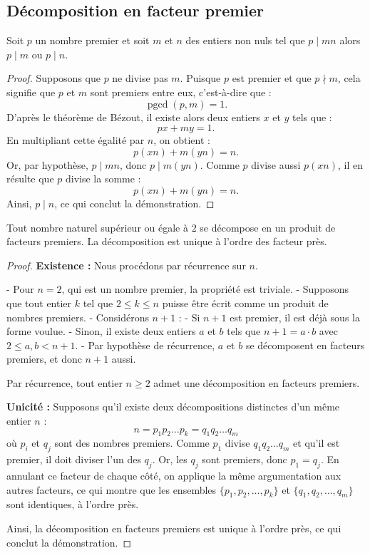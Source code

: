 \subsection{Décomposition en facteur premier}


\begin{lemme}[Euclide]
Soit $p$ un nombre premier et soit $m$ et $n$ des entiers non nuls tel que $p\mid mn$ alors $p\mid m$ ou $p\mid n$.
\end{lemme}

\begin{proof}
Supposons que \( p \) ne divise pas \( m \). Puisque \( p \) est premier et que \( p \nmid m \), cela signifie que \( p \) et \( m \) sont premiers entre eux, c'est-à-dire que :
\[
\operatorname{pgcd}(p, m) = 1.
\]
D'après le théorème de Bézout, il existe alors deux entiers \( x \) et \( y \) tels que :
\[
px + my = 1.
\]
En multipliant cette égalité par \( n \), on obtient :
\[
p(xn) + m(yn) = n.
\]
Or, par hypothèse, \( p \mid mn \), donc \( p \mid m(yn) \). Comme \( p \) divise aussi \( p(xn) \), il en résulte que \( p \) divise la somme :
\[
p(xn) + m(yn) = n.
\]
Ainsi, \( p \mid n \), ce qui conclut la démonstration.
\end{proof}

    

\begin{theoreme}
    Tout nombre naturel supérieur ou égale à $2$ se décompose en un produit de facteurs premiers. La décomposition est unique à l'ordre des facteur près.
\end{theoreme}

\begin{proof}
\textbf{Existence :} Nous procédons par récurrence sur \( n \).

- Pour \( n = 2 \), qui est un nombre premier, la propriété est triviale.
- Supposons que tout entier \( k \) tel que \( 2 \leq k \leq n \) puisse être écrit comme un produit de nombres premiers.
- Considérons \( n+1 \) :
  - Si \( n+1 \) est premier, il est déjà sous la forme voulue.
  - Sinon, il existe deux entiers \( a \) et \( b \) tels que \( n+1 = a \cdot b \) avec \( 2 \leq a, b < n+1 \).
  - Par hypothèse de récurrence, \( a \) et \( b \) se décomposent en facteurs premiers, et donc \( n+1 \) aussi.

Par récurrence, tout entier \( n \geq 2 \) admet une décomposition en facteurs premiers.

\textbf{Unicité :} Supposons qu'il existe deux décompositions distinctes d'un même entier \( n \) :
\[
n = p_1 p_2 \dots p_k = q_1 q_2 \dots q_m
\]
où \( p_i \) et \( q_j \) sont des nombres premiers. Comme \( p_1 \) divise \( q_1 q_2 \dots q_m \) et qu'il est premier, il doit diviser l'un des \( q_j \). Or, les \( q_j \) sont premiers, donc \( p_1 = q_j \). En annulant ce facteur de chaque côté, on applique la même argumentation aux autres facteurs, ce qui montre que les ensembles \( \{p_1, p_2, \dots, p_k\} \) et \( \{q_1, q_2, \dots, q_m\} \) sont identiques, à l'ordre près.

Ainsi, la décomposition en facteurs premiers est unique à l'ordre près, ce qui conclut la démonstration.
\end{proof}
